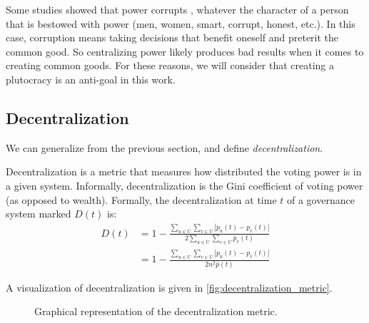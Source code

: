 Some studies showed that power corrupts \autocite{antonakis_does_2014}, whatever the character of a person that is bestowed with power (men, women, smart, corrupt, honest, etc.).
In this case, corruption means taking decisions that benefit oneself and preterit the common good.
So centralizing power likely produces bad results when it comes to creating common goods.
For these reasons, we will consider that creating a plutocracy is an anti-goal in this work.

\subsection{Decentralization}
\label{sec:decentralization}

We can generalize from the previous section, and define \emph{decentralization}.

\begin{definition}[Decentralization]
  \label{def:decentralization}
  Decentralization is a metric that measures how distributed the voting power is in a given system.
  Informally, decentralization is the Gini coefficient of voting power (as opposed to wealth).
  Formally, the decentralization at time $t$ of a governance system marked $D(t)$ is:
  \begin{equation*}
    \begin{split}
      D(t) &= 1 - \frac{\sum_{u\in U}\sum_{v\in U}|p_u(t) - p_v(t)|}{2\sum_{u\in U}\sum_{v\in U}p_v(t)}\\
        &= 1 - \frac{\sum_{u\in U}\sum_{v\in U}|p_u(t) - p_v(t)|}{2n^2\bar p(t)}
    \end{split}
  \end{equation*}
\end{definition}

A visualization of decentralization is given in \autoref{fig:decentralization_metric}.

\begin{figure}[ht]
  
  \caption{%
		\label{fig:decentralization_metric}
		Graphical representation of the decentralization metric.
  }
\end{figure}

